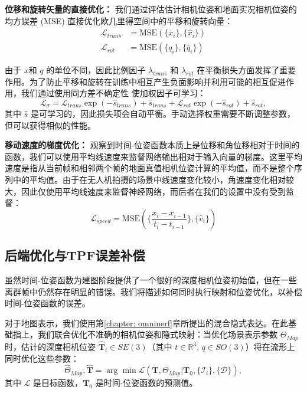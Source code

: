 \textbf{位移和旋转矢量的直接优化：}
我们通过评估估计相机位姿和地面实况相机位姿的均方误差 (MSE) 直接优化欧几里得空间中的平移和旋转向量：
\begin{align}
    \mathcal{L}_{trans} &= \text{MSE}(\{x_i\}, \{\hat{x}_i\})\\
    \mathcal{L}_{rot} &= \text{MSE}(\{q_i\}, \{\hat{q}_i\})
\end{align}

由于 $x$和 $q$ 的单位不同，因此比例因子 $\lambda_{trans}$ 和 $\lambda_{rot}$ 在平衡损失方面发挥了重要作用。为了防止平移和旋转在训练中相互产生负面影响并利用可能的相互促进作用，我们通过使用同方差不确定性 \cite{kendall_geometric_2017} 使加权因子可学习：\begin{equation}
    \mathcal{L}_{\sigma} = \mathcal{L}_{trans} \exp(−\hat{s}_{trans}) + \hat{s}_{trans} + \mathcal{L}_{rot} \exp( −\hat{s}_{rot}) + \hat{s}_{rot},
\end{equation}
其中 $\hat{s}$ 是可学习的，因此损失项会自动平衡。手动选择权重需要不断调整参数，但可以获得相似的性能。

\textbf{移动速度的梯度优化：}
观察到时间-位姿函数本质上是位移和角位移相对于时间的函数，我们可以使用平均线速度来监督网络输出相对于输入向量的梯度。这里平均速度是指从当前帧和相邻两个帧的地面真值相机位姿计算的平均值，而不是整个序列中的平均值。由于在无人机拍摄的场景中线速度变化较小，角速度变化相对较大，因此仅使用平均线速度来监督神经网络，而后者在我们的设置中没有受到监督：
\begin{equation}
    \mathcal{L}_{speed} = \text{MSE}(\{\frac{x_i-x_{i-1}}{t_i-t_{i-1}}\}, \{\hat{v}_i\})
\end{equation}

\subsection{后端优化与TPF误差补偿}
虽然时间-位姿函数为建图阶段提供了一个很好的深度相机位姿初始值，但在一些离群帧中仍然存在明显的错误。我们将描述如何同时执行映射和位姿优化，以补偿时间-位姿函数的误差。

对于地图表示，我们使用第\ref{chapter: omninerf}章所提出的混合隐式表达。在此基础指上，我们联合优化不准确的相机位姿和隐式映射：当优化场景表示参数 $\Theta_{Map}$ 时，估计的深度相机位姿 $\hat{\mathbf{T}}_i \in SE(3)$（其中 $t \in \mathbb{R}^3$, $q \in SO(3)$）将在流形上同时优化这些参数：
\begin{equation}
    \hat{\Theta}_{Map},\hat{\mathbf{T}} = \arg\min\mathcal{L}(\mathbf{T}, \Theta_{Map} | \mathbf{T}_0, \{\mathcal{I}_i\}, \{\mathcal{D}\}),
\end{equation}
其中 $\mathcal{L}$ 是目标函数，$\mathbf{T}_0$ 是时间-位姿函数的预测值。

